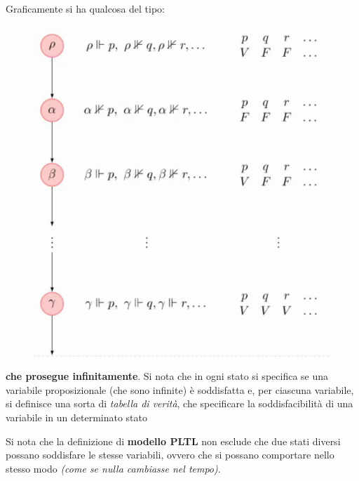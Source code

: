 \documentclass[a4paper,12pt, oneside]{book}
\begin{document}
\begin{esempio}
  Graficamente si ha qualcosa del tipo:
  \begin{figure}[H]
    \centering
    \includegraphics[scale = 0.263]{img/pltl.png}
  \end{figure}
  \textbf{che prosegue infinitamente}. Si nota che in ogni stato si specifica se
  una variabile proposizionale (che sono infinite) è soddisfatta e, per ciascuna
  variabile, si definisce una sorta di \textit{tabella di verità}, che
  specificare la soddisfacibilità di una variabile in un determinato stato
\end{esempio}
Si nota che la definizione di \textbf{modello PLTL} non esclude che due stati
diversi possano soddisfare le stesse variabili, ovvero che si possano comportare
nello stesso modo \textit{(come se nulla cambiasse nel tempo)}.
\end{document}
